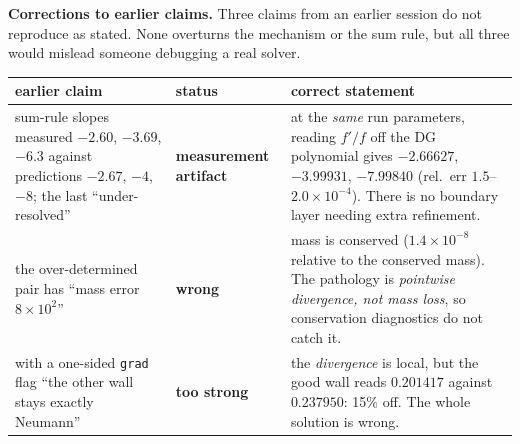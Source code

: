 \documentclass[10pt]{article}
\newcommand{\code}[1]{\texttt{#1}}
\begin{document}
\textbf{Corrections to earlier claims.} Three claims from an earlier session do
not reproduce as stated. None overturns the mechanism or the sum rule, but all
three would mislead someone debugging a real solver.
\begin{center}\small
\begin{tabular}{@{}p{4.4cm}p{2.5cm}p{7.6cm}@{}}
\toprule
earlier claim & status & correct statement \\
\midrule
sum-rule slopes measured $-2.60$, $-3.69$, $-6.3$ against predictions $-2.67$,
$-4$, $-8$; the last ``under-resolved'' & \textbf{measurement artifact} &
at the \emph{same} run parameters, reading $f'/f$ off the DG polynomial gives
$-2.66627$, $-3.99931$, $\mathbf{-7.99840}$ (rel.\ err $1.5$--$2.0\times10^{-4}$).
There is no boundary layer needing extra refinement. \\
\addlinespace
the over-determined pair has ``mass error $8\times10^2$'' & \textbf{wrong} &
mass is conserved ($1.4\times10^{-8}$ relative to the conserved mass). The
pathology is \emph{pointwise divergence, not mass loss}, so conservation
diagnostics do not catch it. \\
\addlinespace
with a one-sided \code{grad} flag ``the other wall stays exactly Neumann'' &
\textbf{too strong} & the \emph{divergence} is local, but the good wall reads
$0.201417$ against $0.237950$: 15\% off. The whole solution is wrong. \\
\bottomrule
\end{tabular}
\end{center}
\end{document}
